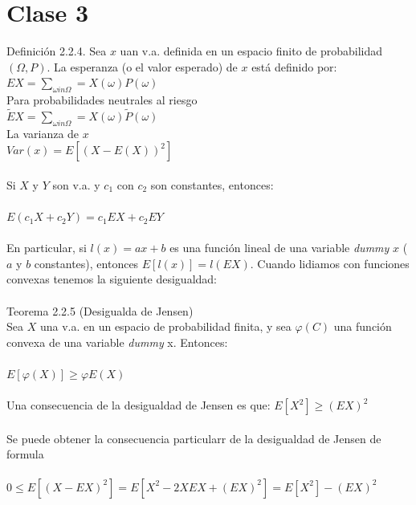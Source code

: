 \documentclass{article}
\begin{document}
        \section{Clase 3}
        Definición 2.2.4. Sea $x$ uan v.a. definida en un espacio finito de probabilidad $(\Omega, P)$. La esperanza (o el valor esperado) de $x$ está definido por:
        \\
        $EX =\sum_{\omega in \Omega} = X(\omega) P(\omega)$
        \\
        Para probabilidades neutrales al riesgo
        \\
        $\tilde{E}X =\sum_{\omega in \Omega} = X(\omega) \tilde{P}(\omega)$
        \\
        La varianza de $x$
        \\
        $Var(x) = E[(X - E(X))^2]$
        \\
        \\
        Si $X$ y $Y$ son v.a. y $c_1$ con $c_2$ son constantes, entonces:
        \\
        \\
        $E(c_1X + c_2Y) = c_1EX + c_2EY$
        \\
        \\
        En particular, si $l(x) = ax+b$ es una función lineal de una variable \textit{dummy} $x$ ($a$ y $b$ constantes), entonces
        $E[l(x)] = l(EX)$. Cuando lidiamos con funciones convexas tenemos la siguiente desigualdad:
        \\
        \\
        Teorema 2.2.5 (Desigualda de Jensen)
        \\
        Sea $X$ una v.a. en un espacio de probabilidad finita, y sea $\varphi(C)$ una función convexa de una variable \textit{dummy} x. Entonces:
        \\
        \\
        $E[\varphi(X)] \ge  \varphi E(X)$
        \\
        \\
        Una consecuencia de la desigualdad de Jensen es que:
        $E[X^2] \ge (EX)^2$
        \\
        \\
        Se puede obtener la consecuencia particularr de la desigualdad de Jensen de formula
        \\
        \\
        $0 \le E[(X - EX)^2] = E[X^2 - 2XEX + (EX)^2] = E[X^2] - (EX)^2$
        \\
\end{document}
